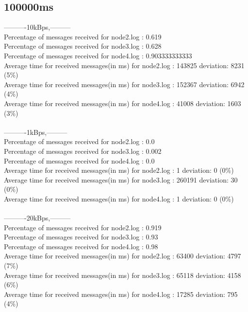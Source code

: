     \subsection{100000ms}\label{RawResults:100000ms}
        ----------10kBps,---------\\
        Percentage of messages received for node2.log : 0.619\\
        Percentage of messages received for node3.log : 0.628\\
        Percentage of messages received for node4.log : 0.903333333333\\
        Average time for received messages(in ms) for  node2.log : 143825   deviation: 8231 (5\%)\\
        Average time for received messages(in ms) for  node3.log : 152367   deviation: 6942 (4\%)\\
        Average time for received messages(in ms) for  node4.log : 41008    deviation: 1603 (3\%)\\\\
        ----------1kBps,---------\\
        Percentage of messages received for node2.log : 0.0\\
        Percentage of messages received for node3.log : 0.002\\
        Percentage of messages received for node4.log : 0.0\\
        Average time for received messages(in ms) for  node2.log : 1    deviation: 0 (0\%)\\
        Average time for received messages(in ms) for  node3.log : 260191   deviation: 30 (0\%)\\
        Average time for received messages(in ms) for  node4.log : 1    deviation: 0 (0\%)\\\\
        ----------20kBps,---------\\
        Percentage of messages received for node2.log : 0.919\\
        Percentage of messages received for node3.log : 0.93\\
        Percentage of messages received for node4.log : 0.98\\
        Average time for received messages(in ms) for  node2.log : 63400    deviation: 4797 (7\%)\\
        Average time for received messages(in ms) for  node3.log : 65118    deviation: 4158 (6\%)\\
        Average time for received messages(in ms) for  node4.log : 17285    deviation: 795 (4\%)\\\\

